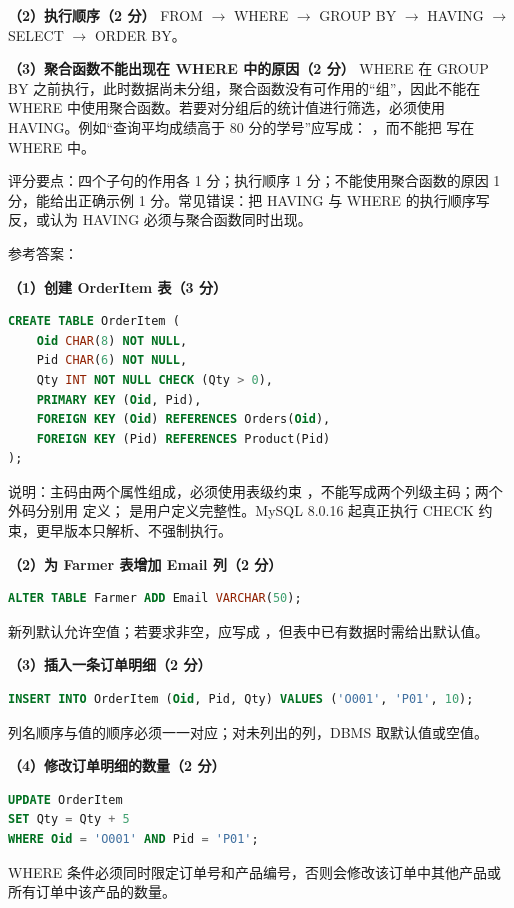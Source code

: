 \documentclass[a4paper,11pt]{article}
\begin{document}
\textbf{（2）执行顺序（2 分）}
FROM $\rightarrow$ WHERE $\rightarrow$ GROUP BY $\rightarrow$ HAVING $\rightarrow$ SELECT $\rightarrow$ ORDER BY。

\textbf{（3）聚合函数不能出现在 WHERE 中的原因（2 分）}
WHERE 在 GROUP BY 之前执行，此时数据尚未分组，聚合函数没有可作用的“组”，因此不能在 WHERE 中使用聚合函数。若要对分组后的统计值进行筛选，必须使用 HAVING。例如“查询平均成绩高于 80 分的学号”应写成：
，而不能把  写在 WHERE 中。
\begin{analysis}评分要点：四个子句的作用各 1 分；执行顺序 1 分；不能使用聚合函数的原因 1 分，能给出正确示例 1 分。常见错误：把 HAVING 与 WHERE 的执行顺序写反，或认为 HAVING 必须与聚合函数同时出现。\end{analysis}


\q 参考答案：

\textbf{（1）创建 OrderItem 表（3 分）}
\begin{lstlisting}[language=SQL]
CREATE TABLE OrderItem (
    Oid CHAR(8) NOT NULL,
    Pid CHAR(6) NOT NULL,
    Qty INT NOT NULL CHECK (Qty > 0),
    PRIMARY KEY (Oid, Pid),
    FOREIGN KEY (Oid) REFERENCES Orders(Oid),
    FOREIGN KEY (Pid) REFERENCES Product(Pid)
);
\end{lstlisting}
说明：主码由两个属性组成，必须使用表级约束 ，不能写成两个列级主码；两个外码分别用  定义； 是用户定义完整性。MySQL 8.0.16 起真正执行 CHECK 约束，更早版本只解析、不强制执行。

\textbf{（2）为 Farmer 表增加 Email 列（2 分）}
\begin{lstlisting}[language=SQL]
ALTER TABLE Farmer ADD Email VARCHAR(50);
\end{lstlisting}
新列默认允许空值；若要求非空，应写成 ，但表中已有数据时需给出默认值。

\textbf{（3）插入一条订单明细（2 分）}
\begin{lstlisting}[language=SQL]
INSERT INTO OrderItem (Oid, Pid, Qty) VALUES ('O001', 'P01', 10);
\end{lstlisting}
列名顺序与值的顺序必须一一对应；对未列出的列，DBMS 取默认值或空值。

\textbf{（4）修改订单明细的数量（2 分）}
\begin{lstlisting}[language=SQL]
UPDATE OrderItem
SET Qty = Qty + 5
WHERE Oid = 'O001' AND Pid = 'P01';
\end{lstlisting}
WHERE 条件必须同时限定订单号和产品编号，否则会修改该订单中其他产品或所有订单中该产品的数量。
\end{document}
